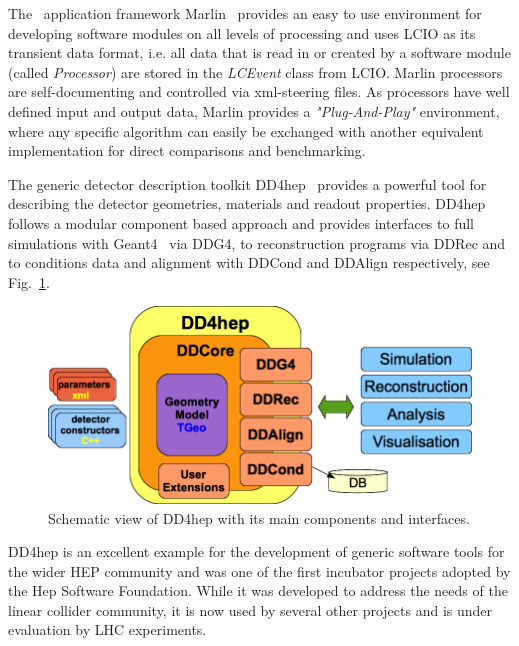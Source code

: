 The \CPP\ application framework Marlin~\cite{Gaede:2006pj} provides an easy to use environment for developing software
modules on all levels of processing and uses LCIO as its transient data format, i.e. all data that is read in or created
by a software module (called \emph{Processor}) are stored in the \emph{LCEvent} class from LCIO. Marlin processors
are self-documenting and controlled via xml-steering files. As processors have well defined input and output data, Marlin
provides a \emph{"Plug-And-Play"} environment, where any specific algorithm can easily be exchanged with another
equivalent implementation for direct comparisons and benchmarking.


The generic detector description toolkit DD4hep~\cite{Frank:2014zya,Frank:2015ivo} provides a powerful tool for describing
the detector geometries, materials and readout properties. DD4hep follows a modular component based approach and provides
interfaces to full simulations with Geant4~\cite{Agostinelli:2002hh} via DDG4, to reconstruction programs via DDRec and to
conditions data and alignment with DDCond and DDAlign respectively, see Fig.~\ref{fig:dd4hep}.
\begin{figure}
\begin{center}
\includegraphics[width=0.90\hsize]{chapters/figures/dd4hep_simple_schema.png}
\end{center}
\caption{Schematic view of DD4hep with its main components and interfaces.}
\label{fig:dd4hep}
\end{figure}
DD4hep is an excellent example for the development of generic software tools for the wider HEP community and was one of the
first incubator projects adopted by the Hep Software Foundation. While it was developed to address the needs of the linear
collider community, it is now used by several other projects and is under evaluation by LHC experiments.


